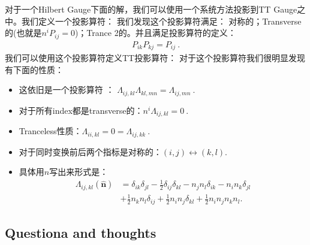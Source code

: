 对于一个Hilbert Gauge下面的解，我们可以使用一个系统方法投影到TT Gauge之中。我们定义一个投影算符：
我们发现这个投影算符满足： 对称的；Transverse的(也就是$ n^iP_{ij} = 0 $)；Trance 2的。并且满足投影算符的定义：
\begin{align}
  P_{ik}P_{kj}=P_{ij}\mathrm{~.}
\end{align}
我们可以使用这个投影算符定义TT投影算符：
对于这个投影算符我们很明显发现有下面的性质：
\begin{itemize}
  \item 这依旧是一个投影算符 ： $ \Lambda_{ij,kl}\Lambda_{kl,mn}=\Lambda_{ij,mn}\mathrm{~.} $
  \item 对于所有index都是transverse的：$ n^i\Lambda_{ij,kl}=0\mathrm{~.} $
  \item Tranceless性质：$ \Lambda_{ii,kl}=0 = \Lambda_{ij,kk}\mathrm{~.} $
  \item 对于同时变换前后两个指标是对称的：$ (i,j)\leftrightarrow(k,l). $
    \item 具体用$ n $写出来形式是：
      \begin{align}
        \Lambda_{ij,kl}(\hat{\mathbf{n}})&=\delta_{ik}\delta_{jl}-\frac{1}{2}\delta_{ij}\delta_{kl}-n_jn_l\delta_{ik}-n_in_k\delta_{jl}\\&\left.+\frac{1}{2}n_kn_l\delta_{ij}+\frac{1}{2}n_in_j\delta_{kl}+\frac{1}{2}n_in_jn_kn_l\right..
      \end{align}
\end{itemize}


\bigskip
{}






\subsection{Questiona and thoughts}


\YL{[目前没有完全理解捏]}

